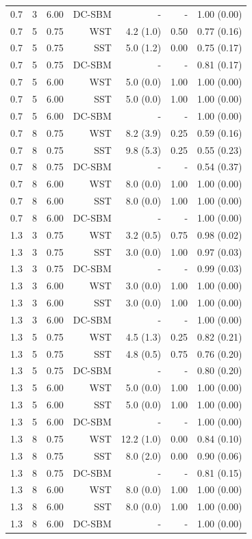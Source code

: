 \begin{table}[!h]
\begin{tabular}[t]{rrrrrrr}
0.7 & 3 & 6.00 & DC-SBM & - & - & 1.00 (0.00)\\
0.7 & 5 & 0.75 & WST & 4.2 (1.0) & 0.50 & 0.77 (0.16)\\
0.7 & 5 & 0.75 & SST & 5.0 (1.2) & 0.00 & 0.75 (0.17)\\
0.7 & 5 & 0.75 & DC-SBM & - & - & 0.81 (0.17)\\
0.7 & 5 & 6.00 & WST & 5.0 (0.0) & 1.00 & 1.00 (0.00)\\
0.7 & 5 & 6.00 & SST & 5.0 (0.0) & 1.00 & 1.00 (0.00)\\
0.7 & 5 & 6.00 & DC-SBM & - & - & 1.00 (0.00)\\
0.7 & 8 & 0.75 & WST & 8.2 (3.9) & 0.25 & 0.59 (0.16)\\
0.7 & 8 & 0.75 & SST & 9.8 (5.3) & 0.25 & 0.55 (0.23)\\
0.7 & 8 & 0.75 & DC-SBM & - & - & 0.54 (0.37)\\
0.7 & 8 & 6.00 & WST & 8.0 (0.0) & 1.00 & 1.00 (0.00)\\
0.7 & 8 & 6.00 & SST & 8.0 (0.0) & 1.00 & 1.00 (0.00)\\
0.7 & 8 & 6.00 & DC-SBM & - & - & 1.00 (0.00)\\
1.3 & 3 & 0.75 & WST & 3.2 (0.5) & 0.75 & 0.98 (0.02)\\
1.3 & 3 & 0.75 & SST & 3.0 (0.0) & 1.00 & 0.97 (0.03)\\
1.3 & 3 & 0.75 & DC-SBM & - & - & 0.99 (0.03)\\
1.3 & 3 & 6.00 & WST & 3.0 (0.0) & 1.00 & 1.00 (0.00)\\
1.3 & 3 & 6.00 & SST & 3.0 (0.0) & 1.00 & 1.00 (0.00)\\
1.3 & 3 & 6.00 & DC-SBM & - & - & 1.00 (0.00)\\
1.3 & 5 & 0.75 & WST & 4.5 (1.3) & 0.25 & 0.82 (0.21)\\
1.3 & 5 & 0.75 & SST & 4.8 (0.5) & 0.75 & 0.76 (0.20)\\
1.3 & 5 & 0.75 & DC-SBM & - & - & 0.80 (0.20)\\
1.3 & 5 & 6.00 & WST & 5.0 (0.0) & 1.00 & 1.00 (0.00)\\
1.3 & 5 & 6.00 & SST & 5.0 (0.0) & 1.00 & 1.00 (0.00)\\
1.3 & 5 & 6.00 & DC-SBM & - & - & 1.00 (0.00)\\
1.3 & 8 & 0.75 & WST & 12.2 (1.0) & 0.00 & 0.84 (0.10)\\
1.3 & 8 & 0.75 & SST & 8.0 (2.0) & 0.00 & 0.90 (0.06)\\
1.3 & 8 & 0.75 & DC-SBM & - & - & 0.81 (0.15)\\
1.3 & 8 & 6.00 & WST & 8.0 (0.0) & 1.00 & 1.00 (0.00)\\
1.3 & 8 & 6.00 & SST & 8.0 (0.0) & 1.00 & 1.00 (0.00)\\
1.3 & 8 & 6.00 & DC-SBM & - & - & 1.00 (0.00)\\
\bottomrule
\end{tabular}
\end{table}
